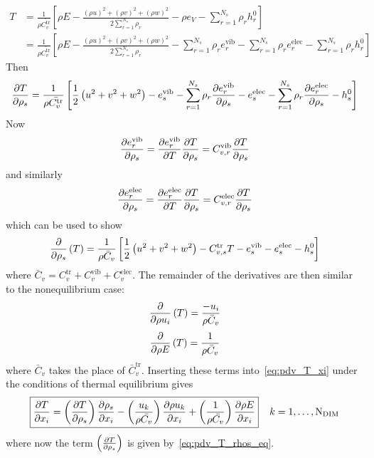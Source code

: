 \begin{align*}
  T &= \frac{1}{\rho \bar{C^{\text{tr}}_v}}\left[\rho E - \frac{\left(\rho u\right)^2+\left(\rho v\right)^2+\left(\rho w\right)^2}{2 \sum_{r=1}^{N_s}\rho_r} - \rho e_V  - \sum_{r=1}^{N_s} \rho_r h^0_r\right] \\
    &= \frac{1}{\rho \bar{C^{\text{tr}}_v}}\left[\rho E - \frac{\left(\rho u\right)^2+\left(\rho v\right)^2+\left(\rho w\right)^2}{2 \sum_{r=1}^{N_s}\rho_r}   - \sum_{r=1}^{N_s} \rho_r e^{\text{vib}}_r   - \sum_{r=1}^{N_s} \rho_r e^{\text{elec}}_r   - \sum_{r=1}^{N_s} \rho_r h^0_r\right]
\end{align*}
Then
\begin{equation*}
  {\frac{\partial{T}}{\partial{\rho_s}}} =\frac{1}{\rho\bar{C^{\text{tr}}_v}}\left[\frac{1}{2}\left(u^2 + v^2 +w^2\right) - e^{\text{vib}}_s - \sum_{r=1}^{N_s} \rho_r {\frac{\partial{e^{\text{vib}}_r}}{\partial{\rho_s}}}- e^{\text{elec}}_s - \sum_{r=1}^{N_s} \rho_r {\frac{\partial{e^{\text{elec}}_r}}{\partial{\rho_s}}}- h^0_s\right]
\end{equation*}
Now
\begin{equation*}
  {\frac{\partial{e^{\text{vib}}_r}}{\partial{\rho_s}}} = {\frac{\partial{e^{\text{vib}}_r}}{\partial{T}}}{\frac{\partial{T}}{\partial{\rho_s}}} = C^{\text{vib}}_{v,r}{\frac{\partial{T}}{\partial{\rho_s}}}
\end{equation*}
and similarly
\begin{equation*}
  {\frac{\partial{e^{\text{elec}}_r}}{\partial{\rho_s}}} = {\frac{\partial{e^{\text{elec}}_r}}{\partial{T}}}{\frac{\partial{T}}{\partial{\rho_s}}} = C^{\text{elec}}_{v,r}{\frac{\partial{T}}{\partial{\rho_s}}}
\end{equation*}
which can be used to show
\begin{equation}
  \label{eq:pdv_T_rhos_eq}
  {\frac{\partial{}}{\partial{\rho_s}}}\left(T\right) =\frac{1}{\rho\bar{C}_v}\left[\frac{1}{2}\left(u^2 + v^2 +w^2\right) - C^{\text{tr}}_{v,s} T - e^{\text{vib}}_s - e^{\text{elec}}_s - h^0_s\right]
\end{equation}
where $\bar{C}_v = C^{\text{tr}}_v + C^{\text{vib}}_v + C^{\text{elec}}_v$.  The remainder of the derivatives are then similar to the nonequilibrium case:
\begin{equation}
  {\frac{\partial{}}{\partial{\rho u_i}}}\left(T\right) = \frac{-u_i}{\rho \bar{C}_v}
\end{equation}
\begin{equation}
  {\frac{\partial{}}{\partial{\rho E}}}\left(T\right) = \frac{1}{\rho \bar{C}_v}
\end{equation}
where $\bar{C}_v$ takes the place of $\bar{C}^{\text{tr}}_v$. Inserting these terms into~\eqref{eq:pdv_T_xi} under the conditions of thermal equilibrium gives
\begin{equation}
  \boxed{{\frac{\partial{T}}{\partial{x_i}}} = \left({\frac{\partial{T}}{\partial{\rho_s}}}\right){\frac{\partial{\rho_s}}{\partial{x_i}}} - \left(\frac{u_k}{\rho\bar{C_v}}\right){\frac{\partial{\rho u_k}}{\partial{x_i}}} + \left(\frac{1}{\rho\bar{C_v}}\right){\frac{\partial{\rho E}}{\partial{x_i}}}}\;\;\;\; k=1,\ldots,\text{N}_{\text{DIM}}
\end{equation}
where now the term $ \left({\frac{\partial{T}}{\partial{\rho_s}}}\right)$ is given by~\eqref{eq:pdv_T_rhos_eq}.




